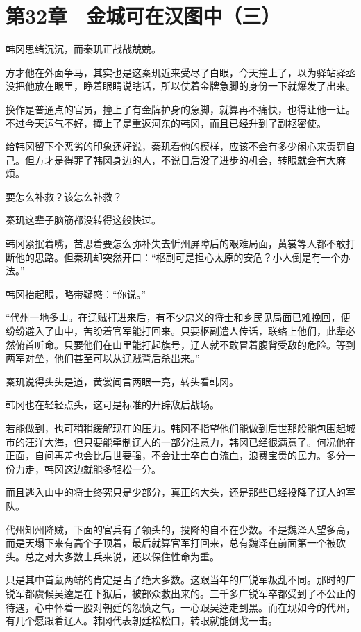 \section{第32章　金城可在汉图中（三）}

韩冈思绪沉沉，而秦玑正战战兢兢。

方才他在外面争马，其实也是这秦玑近来受尽了白眼，今天撞上了，以为驿站驿丞没把他放在眼里，睁着眼睛说瞎话，所以仗着金牌急脚的身份一下就爆发了出来。

换作是普通点的官员，撞上了有金牌护身的急脚，就算再不痛快，也得让他一让。不过今天运气不好，撞上了是重返河东的韩冈，而且已经升到了副枢密使。

给韩冈留下个恶劣的印象还好说，秦玑看他的模样，应该不会有多少闲心来责罚自己。但方才是得罪了韩冈身边的人，不说日后没了进步的机会，转眼就会有大麻烦。

要怎么补救？该怎么补救？

秦玑这辈子脑筋都没转得这般快过。

韩冈紧抿着嘴，苦思着要怎么弥补失去忻州屏障后的艰难局面，黄裳等人都不敢打断他的思路。但秦玑却突然开口：“枢副可是担心太原的安危？小人倒是有一个办法。”

韩冈抬起眼，略带疑惑：“你说。”

“代州一地多山。在辽贼打进来后，有不少忠义的将士和乡民见局面已难挽回，便纷纷避入了山中，苦盼着官军能打回来。只要枢副遣人传话，联络上他们，此辈必然俯首听命。只要他们在山里能打起旗号，辽人就不敢冒着腹背受敌的危险。等到两军对垒，他们甚至可以从辽贼背后杀出来。”

秦玑说得头头是道，黄裳闻言两眼一亮，转头看韩冈。

韩冈也在轻轻点头，这可是标准的开辟敌后战场。

若能做到，也可稍稍缓解现在的压力。韩冈不指望他们能做到后世那般能包围起城市的汪洋大海，但只要能牵制辽人的一部分注意力，韩冈已经很满意了。何况他在正面，自问再差也会比后世要强，不会让士卒白白流血，浪费宝贵的民力。多分一份力走，韩冈这边就能多轻松一分。

而且逃入山中的将士终究只是少部分，真正的大头，还是那些已经投降了辽人的军队。

代州知州降贼，下面的官兵有了领头的，投降的自不在少数。不是魏泽人望多高，而是天塌下来有高个子顶着，最后就算官军打回来，总有魏泽在前面第一个被砍头。总之对大多数士兵来说，还以保住性命为重。

只是其中首鼠两端的肯定是占了绝大多数。这跟当年的广锐军叛乱不同。那时的广锐军都虞候吴逵是在下狱后，被部众救出来的。三千多广锐军卒都受到了不公正的待遇，心中怀着一股对朝廷的怨愤之气，一心跟吴逵走到黑。而在现如今的代州，有几个愿跟着辽人。韩冈代表朝廷松松口，转眼就能倒戈一击。

